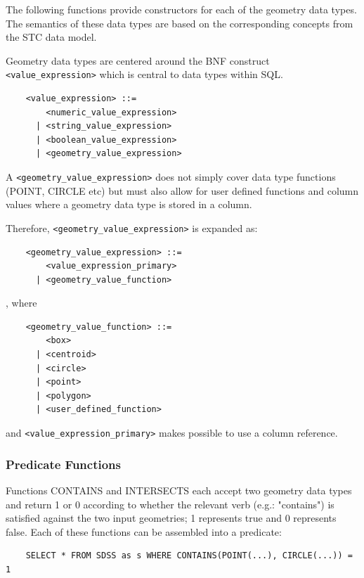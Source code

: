 \documentclass[11pt,a4paper]{ivoa}
\begin{document}
The following functions provide constructors for each of the geometry data types.
The semantics of these data types are based on the corresponding
concepts from the STC data model.

Geometry data types are centered around the BNF construct
\verb:<value_expression>: which is central to data types within SQL.

\begin{verbatim}
    <value_expression> ::=
        <numeric_value_expression>
      | <string_value_expression>
      | <boolean_value_expression>
      | <geometry_value_expression>
\end{verbatim}

A \verb:<geometry_value_expression>: does not simply cover data type functions
(POINT, CIRCLE etc) but must also allow for user defined functions and
column values where a geometry data type is stored in a column.

Therefore, \verb:<geometry_value_expression>: is expanded as:

\begin{verbatim}
    <geometry_value_expression> ::= 
        <value_expression_primary>
      | <geometry_value_function>
\end{verbatim}

, where

\begin{verbatim}
    <geometry_value_function> ::=
        <box>
      | <centroid>
      | <circle>
      | <point>
      | <polygon>
      | <user_defined_function>
\end{verbatim}

and \verb:<value_expression_primary>: makes possible to use a column reference.

\subsubsection{Predicate Functions}
\label{sec:functions.geom.predicate}

Functions CONTAINS and INTERSECTS each accept two geometry data types
and return 1 or 0 according to whether the relevant verb (e.g.: "contains") is
satisfied against the two input geometries; 1 represents true and 0 represents
false. Each of these functions can be assembled into a predicate:

\begin{verbatim}
    SELECT * FROM SDSS as s WHERE CONTAINS(POINT(...), CIRCLE(...)) = 1
\end{verbatim}
\end{document}
